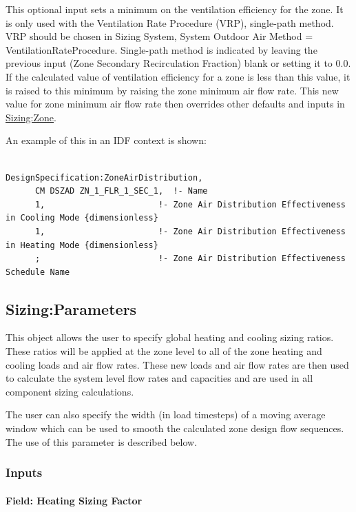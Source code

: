 This optional input sets a minimum on the ventilation efficiency for the zone. It is only used with the Ventilation Rate Procedure (VRP), single-path method. VRP should be chosen in Sizing System, System Outdoor Air Method = VentilationRateProcedure. Single-path method is indicated by leaving the previous input (Zone Secondary Recirculation Fraction) blank or setting it to 0.0. If the calculated value of ventilation efficiency for a zone is less than this value, it is raised to this minimum by raising the zone minimum air flow rate. This new value for zone minimum air flow rate then overrides other defaults and inputs in \hyperref[sizingzone]{Sizing:Zone}.

An example of this in an IDF context is shown:

\begin{lstlisting}

DesignSpecification:ZoneAirDistribution,
      CM DSZAD ZN_1_FLR_1_SEC_1,  !- Name
      1,                       !- Zone Air Distribution Effectiveness in Cooling Mode {dimensionless}
      1,                       !- Zone Air Distribution Effectiveness in Heating Mode {dimensionless}
      ;                        !- Zone Air Distribution Effectiveness Schedule Name
\end{lstlisting}

\subsection{Sizing:Parameters}\label{sizingparameters}

This object allows the user to specify global heating and cooling sizing ratios. These ratios will be applied at the zone level to all of the zone heating and cooling loads and air flow rates. These new loads and air flow rates are then used to calculate the system level flow rates and capacities and are used in all component sizing calculations.

The user can also specify the width (in load timesteps) of a moving average window which can be used to smooth the calculated zone design flow sequences. The use of this parameter is described below.

\subsubsection{Inputs}\label{inputs-2-010}

\paragraph{Field: Heating Sizing Factor}\label{field-heating-sizing-factor}

